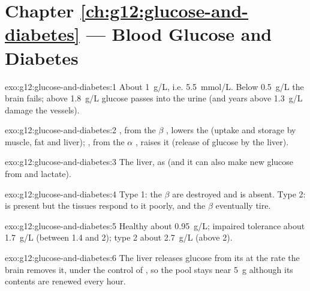 \section*{Chapter \ref{ch:g12:glucose-and-diabetes} --- Blood Glucose and Diabetes}

\begin{solution}{exo:g12:glucose-and-diabetes:1}
About \qty{1}{g/L}, i.e. \qty{5.5}{mmol/L}. Below \qty{0.5}{g/L} the
brain fails; above \qty{1.8}{g/L} glucose passes into the urine (and
years above \qty{1.3}{g/L} damage the vessels).
\end{solution}

\begin{solution}{exo:g12:glucose-and-diabetes:2}
, from the $\beta$ , lowers the  (uptake and
storage by muscle, fat and liver); , from the $\alpha$ ,
raises it (release of glucose by the liver).
\end{solution}

\begin{solution}{exo:g12:glucose-and-diabetes:3}
The liver, as  (and it can also make new glucose from  and lactate).
\end{solution}

\begin{solution}{exo:g12:glucose-and-diabetes:4}
Type 1: the $\beta$  are destroyed and  is absent. Type 2:
 is present but the tissues respond to it poorly, and the
$\beta$  eventually tire.
\end{solution}

\begin{solution}{exo:g12:glucose-and-diabetes:5}
Healthy about \qty{0.95}{g/L}; impaired tolerance about \qty{1.7}{g/L}
(between 1.4 and 2); type 2 about \qty{2.7}{g/L} (above 2).
\end{solution}

\begin{solution}{exo:g12:glucose-and-diabetes:6}
The liver releases glucose from its  at the rate the brain
removes it, under the control of , so the pool stays near
\qty{5}{g} although its contents are renewed every hour.
\end{solution}

